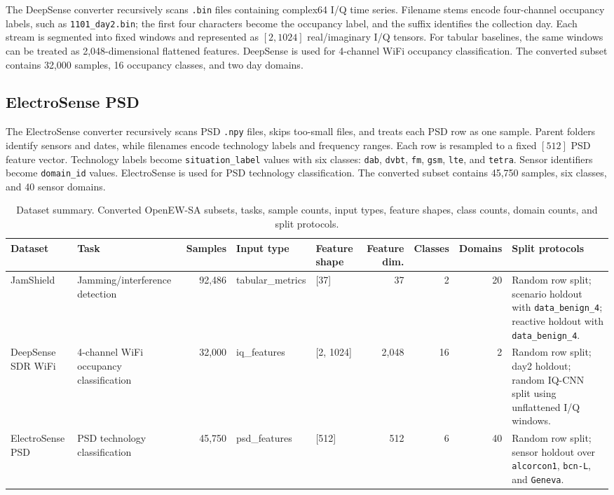 \documentclass[11pt]{article}
\newcommand{\artifact}[1]{\texttt{#1}}
\begin{document}
The DeepSense converter recursively scans \artifact{.bin} files containing complex64 I/Q time series. Filename stems encode four-channel occupancy labels, such as \artifact{1101\_day2.bin}; the first four characters become the occupancy label, and the suffix identifies the collection day. Each stream is segmented into fixed windows and represented as $[2, 1024]$ real/imaginary I/Q tensors. For tabular baselines, the same windows can be treated as 2,048-dimensional flattened features. DeepSense is used for 4-channel WiFi occupancy classification. The converted subset contains 32,000 samples, 16 occupancy classes, and two day domains.

\subsection{ElectroSense PSD}

The ElectroSense converter recursively scans PSD \artifact{.npy} files, skips too-small files, and treats each PSD row as one sample. Parent folders identify sensors and dates, while filenames encode technology labels and frequency ranges. Each row is resampled to a fixed $[512]$ PSD feature vector. Technology labels become \artifact{situation\_label} values with six classes: \artifact{dab}, \artifact{dvbt}, \artifact{fm}, \artifact{gsm}, \artifact{lte}, and \artifact{tetra}. Sensor identifiers become \artifact{domain\_id} values. ElectroSense is used for PSD technology classification. The converted subset contains 45,750 samples, six classes, and 40 sensor domains.

\begin{table}[t]
  \centering
  \scriptsize
  \setlength{\tabcolsep}{3pt}
  \renewcommand{\arraystretch}{1.18}
  \caption{Dataset summary. Converted OpenEW-SA subsets, tasks, sample counts, input types, feature shapes, class counts, domain counts, and split protocols.}
  \label{tab:dataset-summary}
  \begin{tabularx}{\textwidth}{L{0.12\textwidth} L{0.18\textwidth} r L{0.10\textwidth} L{0.09\textwidth} r r r Y}
    \toprule
    Dataset & Task & Samples & Input type & Feature shape & Feature dim. & Classes & Domains & Split protocols \\
    \midrule
    JamShield & Jamming/interference detection & 92,486 & tabular\_metrics & [37] & 37 & 2 & 20 & Random row split; scenario holdout with \artifact{data\_benign\_4}; reactive holdout with \artifact{data\_benign\_4}. \\
    DeepSense SDR WiFi & 4-channel WiFi occupancy classification & 32,000 & iq\_features & [2, 1024] & 2,048 & 16 & 2 & Random row split; day2 holdout; random IQ-CNN split using unflattened I/Q windows. \\
    ElectroSense PSD & PSD technology classification & 45,750 & psd\_features & [512] & 512 & 6 & 40 & Random row split; sensor holdout over \artifact{alcorcon1}, \artifact{bcn-L}, and \artifact{Geneva}. \\
    \bottomrule
  \end{tabularx}
\end{table}
\end{document}
